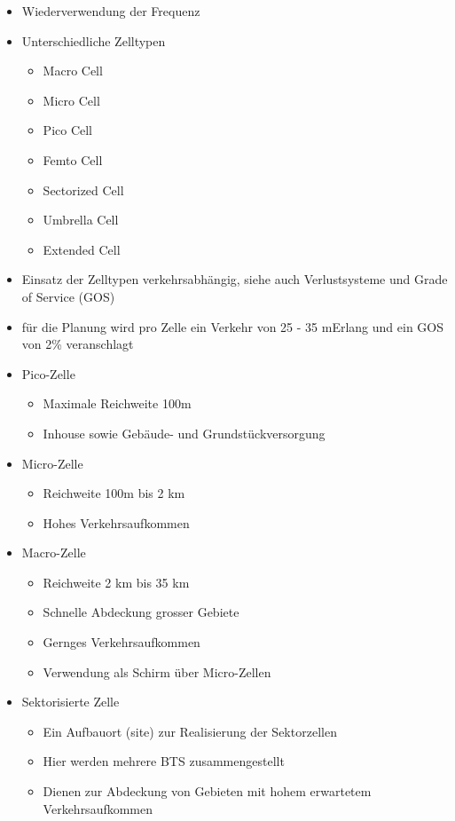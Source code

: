 \begin{itemize}
\item Wiederverwendung der Frequenz
\item Unterschiedliche Zelltypen
\begin{itemize}
\item Macro Cell
\item Micro Cell
\item Pico Cell
\item Femto Cell
\item Sectorized Cell
\item Umbrella Cell
\item Extended Cell
\end{itemize}
\item Einsatz der Zelltypen verkehrsabhängig, siehe auch Verlustsysteme und Grade of Service (GOS)
\item für die Planung wird pro Zelle ein Verkehr von 25 - 35 mErlang und ein GOS von 2\% veranschlagt
\end{itemize}
\vspace{0.5 cm}
\begin{minipage}{0.7 \linewidth}
\begin{itemize}
\item Pico-Zelle
\begin{itemize}
\item Maximale Reichweite 100m
\item Inhouse sowie Gebäude- und Grundstückversorgung
\end{itemize}
\item Micro-Zelle
\begin{itemize}
\item Reichweite 100m bis 2 km
\item Hohes Verkehrsaufkommen
\end{itemize}
\item Macro-Zelle
\begin{itemize}
\item Reichweite 2 km bis 35 km
\item Schnelle Abdeckung grosser Gebiete 
\item Gernges Verkehrsaufkommen
\item Verwendung als Schirm über Micro-Zellen
\end{itemize}
\item Sektorisierte Zelle
\begin{itemize}
\item Ein Aufbauort (site) zur Realisierung der Sektorzellen
\item Hier werden mehrere BTS zusammengestellt
\item Dienen zur Abdeckung von Gebieten mit hohem erwartetem Verkehrsaufkommen
\end{itemize}
\end{itemize}
\end{minipage}
